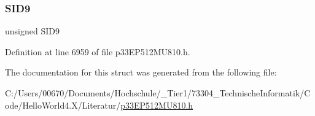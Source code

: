 \subsubsection{\texorpdfstring{S\+I\+D9}{SID9}}
{\footnotesize\ttfamily unsigned S\+I\+D9}



Definition at line 6959 of file p33\+E\+P512\+M\+U810.\+h.



The documentation for this struct was generated from the following file\+:\begin{DoxyCompactItemize}
\item 
C\+:/\+Users/00670/\+Documents/\+Hochschule/\+\_\+\+Tier1/73304\+\_\+\+Technische\+Informatik/\+Code/\+Hello\+World4.\+X/\+Literatur/\hyperlink{p33_e_p512_m_u810_8h}{p33\+E\+P512\+M\+U810.\+h}\end{DoxyCompactItemize}
